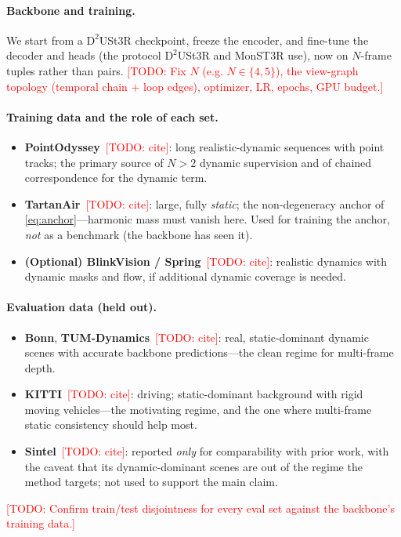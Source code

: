 \documentclass{article}
\newcommand{\todo}[1]{\textcolor{red}{[TODO: #1]}}
\theoremstyle{definition}
\theoremstyle{plain}
\theoremstyle{remark}
\begin{document}
\paragraph{Backbone and training.}
We start from a $\mathrm{D}^2$USt3R checkpoint, freeze the encoder, and
fine-tune the decoder and heads (the protocol $\mathrm{D}^2$USt3R and
MonST3R use), now on $N$-frame tuples rather than pairs.
\todo{Fix $N$ (e.g. $N\!\in\!\{4,5\}$), the view-graph topology
(temporal chain $+$ loop edges), optimizer, LR, epochs, GPU budget.}

\paragraph{Training data and the role of each set.}
\begin{itemize}[leftmargin=1.4em,itemsep=0.1em,topsep=0.1em]
  \item \textbf{PointOdyssey}~\todo{cite}: long realistic-dynamic
        sequences with point tracks; the primary source of $N>2$ dynamic
        supervision and of chained correspondence for the dynamic term.
  \item \textbf{TartanAir}~\todo{cite}: large, fully \emph{static}; the
        non-degeneracy anchor of \eqref{eq:anchor}---harmonic mass must
        vanish here. Used for training the anchor, \emph{not} as a
        benchmark (the backbone has seen it).
  \item \textbf{(Optional) BlinkVision / Spring}~\todo{cite}: realistic
        dynamics with dynamic masks and flow, if additional dynamic
        coverage is needed.
\end{itemize}

\paragraph{Evaluation data (held out).}
\begin{itemize}[leftmargin=1.4em,itemsep=0.1em,topsep=0.1em]
  \item \textbf{Bonn}, \textbf{TUM-Dynamics}~\todo{cite}: real,
        static-dominant dynamic scenes with accurate backbone
        predictions---the clean regime for multi-frame depth.
  \item \textbf{KITTI}~\todo{cite}: driving; static-dominant background
        with rigid moving vehicles---the motivating regime, and the one
        where multi-frame static consistency should help most.
  \item \textbf{Sintel}~\todo{cite}: reported \emph{only} for
        comparability with prior work, with the caveat that its
        dynamic-dominant scenes are out of the regime the method targets;
        not used to support the main claim.
\end{itemize}
\todo{Confirm train/test disjointness for every eval set against the
backbone's training data.}
\end{document}
